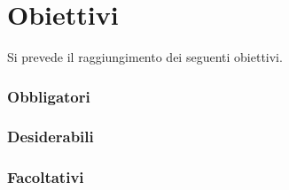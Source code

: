 
\section{Obiettivi}
		Si prevede il raggiungimento dei seguenti obiettivi.

		\subsubsection*{Obbligatori}
		\begin{itemize}
			\obiettiviObbligatori
		\end{itemize}
		
		\subsubsection*{Desiderabili}
		\begin{itemize}
			\obiettiviDesiderabili
		\end{itemize}
		
		\subsubsection*{Facoltativi}
		\begin{itemize}
			\obiettiviFacoltativi
		\end{itemize} 

